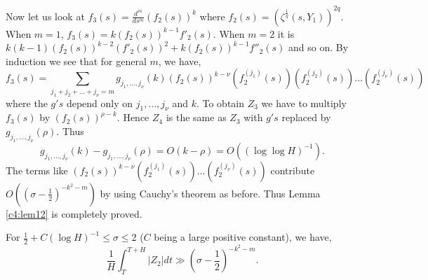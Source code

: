 Now let us look at $f_3 (s) =\frac{d^m}{ds^m} (f_2 (s))^k$ where $f_2(s) = (\zeta^{\frac{1}{q}} (s, Y_1))^{2q} $. When $m=1$, $f_3(s) = k (f_2 (s))^{k-1} f'_2 (s)$. When $m=2$ it is $k(k-1) (f_2(s))^{k-2} (f'_2(s))^2 + k (f_2 (s))^{k-1} f''_2 (s)$ and so on. By induction we see that for general $m$, we have,
$$
f_3(s) = \sum\limits_{j_1  + j_2 + \ldots + j_\nu = m} g_{j_1, \ldots, j_\nu} (k) (f_2(s))^{k-\nu} (f^{(j_1)}_2 (s)) (f^{(j_2)}_2 (s)) \ldots (f^{(j_\nu)}_2 (s))
$$
where the $g's$ depend only on $j_1, \ldots, j_\nu$ and $k$. To obtain $Z_3$ we have to multiply $f_3(s)$ by $(f_2 (s))^{\rho-k}$. Hence $Z_4$ is the same as $Z_3$ with $g's$ replaced by $g_{j_1, \ldots, j_\nu} (\rho)$. Thus
$$
g_{j_1, \ldots, j_\nu} (k) - g_{j_1, \ldots, j_\nu} (\rho) = O(k-\rho) = O((\log \log H)^{-1}
).
$$
The terms like $(f_2 (s))^{k-\nu} (f^{(j_1)}_2 (s)) \ldots (f^{(j_\nu)}_2(s))$ contribute $O((\sigma -\frac{1}{2})^{-k^2 -m})$ by using Cauchy's theorem as before. Thus Lemma \ref{c4:lem12} is completely proved.

\begin{lem}\label{c4:lem13}
For $\frac{1}{2} + C (\log H)^{-1} \leq \sigma \leq 2$ ($C$ being a large positive constant), we have,
\begin{equation*}
\frac{1}{H} \int^{T+H}_T |Z_2| dt \gg (\sigma -\frac{1}{2})^{-k^2 -m}. \tag{4.2.25}\label{c4:eq4.2.25}
\end{equation*}
\end{lem}

